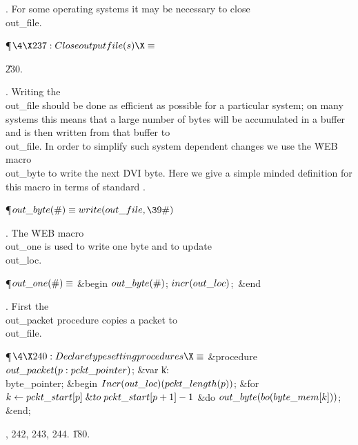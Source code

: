 . For some operating systems it may be necessary to close \\{out\_file}.

\Y\P$\4\X237:Close output file(s)\X\S$\par
\U230.\fi

. Writing the \\{out\_file} should be done as efficient as possible for a
particular system; on many systems this means that a large number of
bytes will be accumulated in a buffer and is then written from that
buffer to \\{out\_file}. In order to simplify such system dependent changes
we use the \.{WEB} macro \\{out\_byte} to write the next \.{DVI} byte. Here
we give a simple minded definition for this macro in terms of standard
\PASCAL.

\Y\P\D {}$\\{out\_byte}(\#)\S\\{write}(\\{out\_file},\39\#)$\par
\fi

. The \.{WEB} macro \\{out\_one} is used to write one byte and to update
\\{out\_loc}.

\Y\P\D {}$\\{out\_one}(\#)\S$\1\6
\&{begin} $\\{out\_byte}(\#)$;\5
$\\{incr}(\\{out\_loc})$;\ \&{end}\2\par
\fi

. First the \\{out\_packet} procedure copies a packet to \\{out\_file}.

\Y\P$\4\X240:Declare typesetting procedures\X\S$\6
\4\&{procedure}\1\  $\\{out\_packet}(\|p:\\{pckt\_pointer})$;\6
\4\&{var} \|k: \\{byte\_pointer};\2\6
\&{begin} $\\{Incr}(\\{out\_loc})(\\{pckt\_length}(\|p))$;\6
\&{for} $\|k\K\\{pckt\_start}[\|p]\mathrel{\&{to}}\\{pckt\_start}[\|p+1]-1$ \1%
\&{do}\5
$\\{out\_byte}(\\{bo}(\\{byte\_mem}[\|k]))$;\2\6
\&{end};\par
{}, 242, 243, 244.
\U180.\fi


